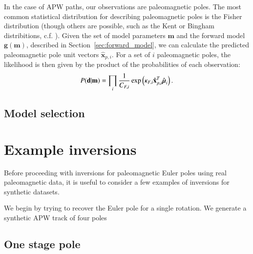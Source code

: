\documentclass[preprint,12pt,authoryear]{elsarticle}
\newcommand{\mitbf}[1]{\hbox{\mathversion{bold}$#1$}}
\begin{document}
In the case of APW paths, our observations are paleomagnetic poles.
The most common statistical distribution for describing paleomagnetic poles is the Fisher distribution
(though others are possible, such as the Kent or Bingham distribitions, c.f. \citet{tauxe2009essentials}).
Given the set of model parameters $\mathbf{m}$ and the forward model $\mathbf{g}(\mathbf{m})$, described
in Section~\ref{sec:forward_model}, we can calculate the predicted paleomagnetic pole unit vectors $\hat{\mathbf{x}}_{p,i}$.
For a set of $i$ paleomagnetic poles, the likelihood is then given by the product of the probabilities
of each observation:
\begin{equation}
P(\mathbf{d} \vert \mathbf{m}) = \displaystyle\prod_i \frac{1}{C_{F,i}} \exp \left( \kappa_{F,i} \hat{\mathbf{x}}_{p,i}^T \hat{\mitbf{\mu}}_i \right).
\label{eq:model_likelihood}
\end{equation}


\subsection{Model selection}

\section{Example inversions}
\label{sec:example_inversion}

Before proceeding with inversions for paleomagnetic Euler poles using real paleomagnetic data,
it is useful to consider a few examples of inversions for synthetic datasets.

We begin by trying to recover the Euler pole for a single rotation.
We generate a synthetic APW track of four poles

\subsection{One stage pole}
\end{document}
